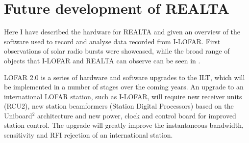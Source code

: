 \section{Future development of REALTA}
\label{sec:realta_future_work}

Here I have described the hardware for REALTA and given an overview of the software used to record and analyse data recorded from I-LOFAR. First observations of solar radio bursts were showcased, while the broad range of objects that I-LOFAR and REALTA can observe can be seen in \cite{Murphy2021b}. 

LOFAR 2.0 is a series of hardware and software upgrades to the ILT, which will be implemented in a number of stages over the coming years. An upgrade to an international LOFAR station, such as I-LOFAR, will require new receiver units (RCU2), new station beamformers (Station Digital Processors) based on the Uniboard$^2$ architecture \citep{Schoonderbeek2019} and new power, clock and control board for improved station control. The upgrade will greatly improve the instantaneous bandwidth, sensitivity and RFI rejection of an international station.


